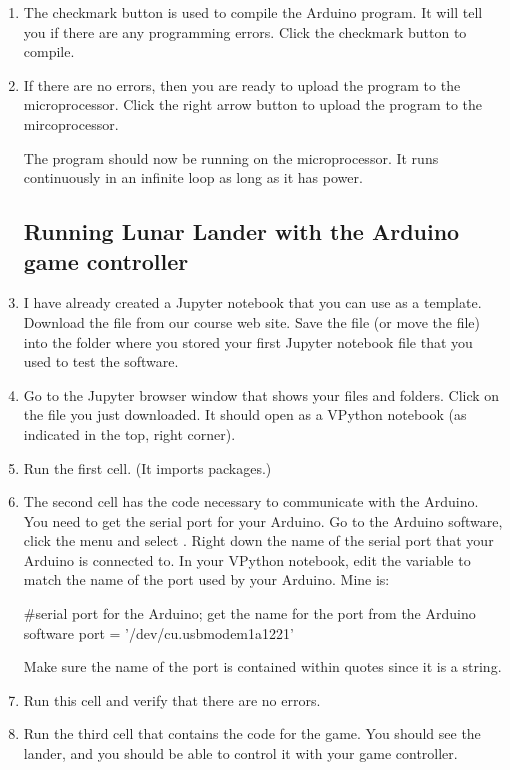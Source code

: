 \begin{enumerate}
\item The checkmark button is used to compile the Arduino program. It will tell you if there are any programming errors. Click the checkmark button to compile.

\item If there are no errors, then you are ready to upload the program to the microprocessor. Click the right arrow button to upload the program to the mircoprocessor.

The program should now be running on the microprocessor. It runs continuously in an infinite loop as long as it has power.

\subsection*{Running Lunar Lander with the Arduino game controller}

\item I have already created a Jupyter notebook that you can use as a template. Download the file  from our course web site. Save the file (or move the file) into the folder where you stored your first Jupyter notebook file that you used to test the software.

\item  Go to the Jupyter browser window that shows your files and folders. Click on the file you just downloaded. It should open as a VPython notebook (as indicated in the top, right corner). 

\item Run the first cell. (It imports packages.)

\item The second cell has the code necessary to communicate with the Arduino. You need to get the serial port for your Arduino. Go to the Arduino software, click the  menu and select . Right down the name of the serial port that your Arduino is connected to. In your VPython notebook, edit the  variable to match the name of the port used by your Arduino. Mine is:

\begin{myvpython}
#serial port for the Arduino; get the name for the port from the Arduino software
port = '/dev/cu.usbmodem1a1221'
\end{myvpython}

Make sure the name of the port is contained within quotes since it is a string.

\item Run this cell and verify that there are no errors.

\item Run the third cell that contains the code for the game. You should see the lander, and you should be able to control it with your game controller.


\end{enumerate}

